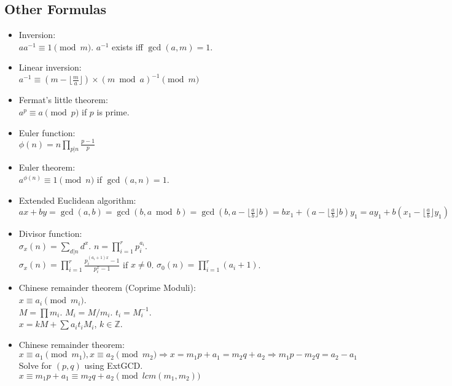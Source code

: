 \documentclass[a4paper,10pt,twocolumn,oneside,x11names]{article}
\begin{document}
\subsection{Other Formulas}
{\normalsize \begin{itemize}
    \item Inversion:\\ $aa^{-1} \equiv 1 \pmod{m}$. $a^{-1}$ exists iff $\gcd(a,m)=1$.
    
    \item Linear inversion:\\ $a^{-1} \equiv (m - \lfloor\frac{m}{a}\rfloor) \times (m \bmod a)^{-1} \pmod{m}$
    
    \item Fermat's little theorem:\\ $a^p \equiv a \pmod{p}$ if $p$ is prime.
    
    \item Euler function:\\ $\phi(n)=n \prod_{p|n} \frac{p-1}{p}$
    
    \item Euler theorem:\\ $a^{\phi(n)} \equiv 1 \pmod{n}$ if $\gcd(a,n) = 1$.
    
    \item Extended Euclidean algorithm:\\
    $ax+by=\gcd(a,b)=\gcd(b, a \bmod b)=\gcd(b, a-\lfloor\frac{a}{b}\rfloor b)=bx_1+(a-\lfloor\frac{a}{b}\rfloor b)y_1=ay_1+b(x_1-\lfloor\frac{a}{b}\rfloor y_1)$
    
    \item Divisor function:\\ $\sigma_x(n) = \sum_{d|n}d^x$. $n=\prod_{i=1}^r p_i^{a_i}$.\\ $\sigma_x(n)=\prod_{i=1}^r \frac{p_i^{(a_i+1)x}-1}{p_i^x-1}$ if $x \neq 0$. $\sigma_0(n)=\prod_{i=1}^r (a_i+1)$.
    
    \item Chinese remainder theorem (Coprime Moduli):\\ $x \equiv a_i \pmod{m_i}$.\\
        $M=\prod m_i$. $M_i=M/m_i$. $t_i=M_i^{-1}$.\\
        $x = kM + \sum a_i t_i M_i$, $k \in \mathbb{Z}$.
        
    \item Chinese remainder theorem:\\
    $x \equiv a_1 \pmod{m_1}, x \equiv a_2 \pmod{m_2} \Rightarrow x = m_1 p + a_1 = m_2 q + a_2 \Rightarrow m_1 p - m_2 q = a_2 - a_1$\\
    Solve for $(p, q)$ using ExtGCD.\\
    $x \equiv m_1 p + a_1 \equiv m_2 q + a_2 \pmod{lcm(m_1, m_2)}$
    

\end{itemize}}
\end{document}
